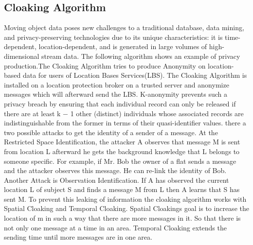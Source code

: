 \documentclass{llncs}
\begin{document}
\subsection{Cloaking Algorithm}
Moving object data poses new challenges to a traditional database, data mining, and privacy-preserving technologies due to its unique characteristics: it is time-dependent, location-dependent, and is generated in large volumes of high-dimensional stream data. The following algorithm shows an example of privacy production.The Cloaking Algorithm tries to produce Anonymity on location-based data for users of Location Bases Services(LBS). The Cloaking Algorithm is installed on a location protection broker on a trusted server and anonymize messages which will afterward send the LBS. K-anonymity prevents such a privacy breach by ensuring that each individual record can only be released if there are at least k − 1 other (distinct) individuals whose associated records are indistinguishable from the former in terms of their quasi-identifier values. there a two possible attacks to get the identity of a sender of a message. At the  Restricted Space Identification, the attacker A observes that message M is sent from location L afterward he gets the background knowledge that L belongs to someone specific. For example, if Mr. Bob the owner of a flat sends a message and the attacker observes this message. He can re-link the identity of Bob. Another Attack is  Observation Identiﬁcation. If A has observed the current location L of subject S and ﬁnds a message M from L then A learns that S has sent M.  To prevent this leaking of information the cloaking algorithm works with Spatial Cloaking and Temporal Cloaking. Spatial Cloakings goal is to increase the location of m in such a way that there are more messages in it. So that there is not only one message at a time in an area. Temporal Cloaking extends the sending time until more messages are in one area. 


\end{document}
